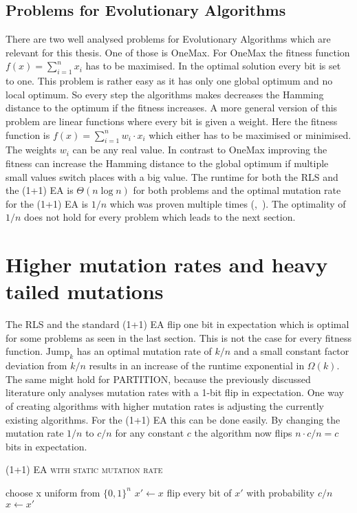\subsection{Problems for Evolutionary Algorithms}
There are two well analysed problems for Evolutionary Algorithms which are relevant for this thesis.
One of those is OneMax.
For OneMax the fitness function $f(x)=\sum_{i=1}^{n}{x_i}$ has to be maximised.
In the optimal solution every bit is set to one.
This problem is rather easy as it has only one global optimum and no local optimum.
So every step the algorithms makes decreases the Hamming distance to the optimum if the fitness increases.
A more general version of this problem are linear functions where every bit is given a weight.
Here the fitness function is $f(x)=\sum_{i=1}^{n}{w_i \cdot x_i}$ which either has to be maximised or minimised.
The weights $w_i$ can be any real value.
In contrast to OneMax improving the fitness can increase the Hamming distance to the global optimum if multiple small values switch places with a big value.
The runtime for both the RLS and the (1+1) EA is $\Theta(n\log{n})$ for both problems and the optimal mutation rate for the (1+1) EA is $1/n$ which was proven multiple times (\cite{witt2013tight},~\cite{doerr2023tight}).
The optimality of $1/n$ does not hold for every problem which leads to the next section.

\section{Higher mutation rates and heavy tailed mutations}
The RLS and the standard (1+1) EA flip one bit in expectation which is optimal for some problems as seen in the last section.
This is not the case for every fitness function.
$\text{Jump}_k$ has an optimal mutation rate of $k/n$ and a small constant factor deviation from $k/n$ results in an increase of the runtime exponential in $\Omega(k)$\cite{doerr2017fast}.
The same might hold for PARTITION, because the previously discussed literature only analyses mutation rates with a 1-bit flip in expectation.\newline
One way of creating algorithms with higher mutation rates is adjusting the currently existing algorithms.
For the (1+1) EA this can be done easily.
By changing the mutation rate $1/n$ to $c/n$ for any constant $c$ the algorithm now flips $n\cdot c/n=c$ bits in expectation.
\begin{algorithm}[bt]
      \caption{\textsc{(1+1) EA with static mutation rate}}\label{alg:EA_SM}

      \DontPrintSemicolon %

      \BlankLine
      choose x uniform from ${\{0,1\}}^n$\;
      {
      $x' \leftarrow x$\;
      flip every bit of $x'$ with probability $c/n$\;
      {
      {
            $x \leftarrow x'$\;
      }
      }
      }
\end{algorithm}

